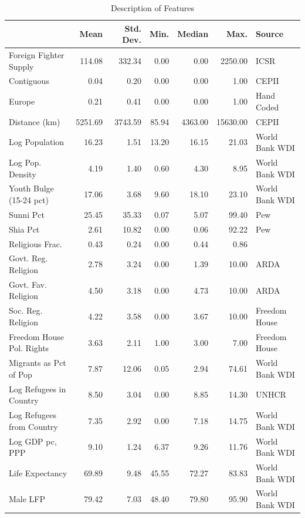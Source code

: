 \documentclass[12pt]{article}
\begin{document}
\begin{table}[!h]
	\footnotesize
	\centering
	\caption{Description of Features} 	\label{tab:data}
\begin{tabular}{lrrrrrl}
	\\ [-1.9ex] \toprule
	& Mean & Std. Dev. & Min. & Median & Max. & Source\\ 
	\midrule
	Foreign Fighter Supply & 114.08 & 332.34 & 0.00 & 0.00 & 2250.00 & ICSR \citep{Neumann2015}\\ 
	Contiguous & 0.04 & 0.20 & 0.00 & 0.00 & 1.00 & CEPII \\ 
	Europe & 0.21 & 0.41 & 0.00 & 0.00 & 1.00 & Hand Coded\\ 
	Distance (km) & 5251.69 & 3743.59 & 85.94 & 4363.00 & 15630.00 & CEPII \\ 
	Log Population & 16.23 & 1.51 & 13.20 & 16.15 & 21.03 & World Bank WDI \\ 
	Log Pop. Density & 4.19 & 1.40 & 0.60 & 4.30 & 8.95 & World Bank WDI\\ 
	Youth Bulge (15-24 pct) & 17.06 & 3.68 & 9.60 & 18.10 & 23.10 & World Bank WDI \\ 
	Sunni Pct & 25.45 & 35.33 & 0.07 & 5.07 & 99.40 & Pew \\ 
	Shia Pct & 2.61 & 10.82 & 0.00 & 0.06 & 92.22 & Pew \\ 
	Religious Frac. & 0.43 & 0.24 & 0.00 & 0.44 & 0.86 & \cite{Fearon2003a} \\ 
	Govt. Reg. Religion & 2.78 & 3.24 & 0.00 & 1.39 & 10.00 & ARDA \\ 
	Govt. Fav. Religion & 4.50 & 3.18 & 0.00 & 4.73 &  10.00 & ARDA \\ 
	Soc. Reg. Religion & 4.22 & 3.58 & 0.00 & 3.67 & 10.00 & Freedom House \\ 
	Freedom House Pol. Rights & 3.63 & 2.11 & 1.00 & 3.00 & 7.00 & Freedom House  \\ 
	Migrants as Pct of Pop & 7.87 & 12.06 & 0.05 & 2.94 & 74.61 & World Bank WDI\\ 
	Log Refugees in Country & 8.50 & 3.04 & 0.00 & 8.85 & 14.30 & UNHCR \\ 
	Log Refugees from Country & 7.35 & 2.92 & 0.00 & 7.18 & 14.75 & World Bank WDI \\ 
	Log GDP pc, PPP & 9.10 & 1.24 & 6.37 & 9.26 & 11.76 & World Bank WDI \\ 
	Life Expectancy & 69.89 & 9.48 & 45.55 & 72.27 & 83.83 & World Bank WDI\\ 
	Male LFP & 79.42 & 7.03 & 48.40 & 79.80 & 95.90 & World Bank WDI \\ 

\end{tabular}
\end{table}
\end{document}
